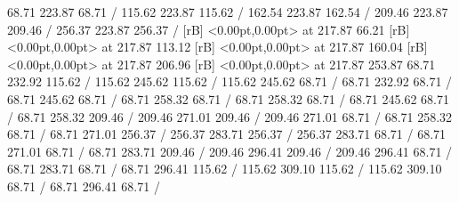 {\setsolid
{} 68.71 223.87 68.71 /
\setsolid
{} 115.62 223.87 115.62 /
\setsolid
{} 162.54 223.87 162.54 /
\setsolid
{} 209.46 223.87 209.46 /
\setsolid
{} 256.37 223.87 256.37 /
 [rB] <0.00pt,0.00pt> at 217.87 66.21
 [rB] <0.00pt,0.00pt> at 217.87 113.12
 [rB] <0.00pt,0.00pt> at 217.87 160.04
 [rB] <0.00pt,0.00pt> at 217.87 206.96
 [rB] <0.00pt,0.00pt> at 217.87 253.87
\setsolid
{} 68.71 232.92 115.62 /
 115.62 245.62 115.62 /
 115.62 245.62 68.71 /
 68.71 232.92 68.71 /
\setsolid
{} 68.71 245.62 68.71 /
 68.71 258.32 68.71 /
 68.71 258.32 68.71 /
 68.71 245.62 68.71 /
\setsolid
{} 68.71 258.32 209.46 /
 209.46 271.01 209.46 /
 209.46 271.01 68.71 /
 68.71 258.32 68.71 /
\setsolid
{} 68.71 271.01 256.37 /
 256.37 283.71 256.37 /
 256.37 283.71 68.71 /
 68.71 271.01 68.71 /
\setsolid
{} 68.71 283.71 209.46 /
 209.46 296.41 209.46 /
 209.46 296.41 68.71 /
 68.71 283.71 68.71 /
\setsolid
{} 68.71 296.41 115.62 /
 115.62 309.10 115.62 /
 115.62 309.10 68.71 /
 68.71 296.41 68.71 /
\endpicture
}
